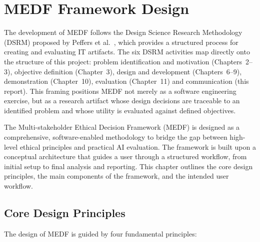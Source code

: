 \chapter{MEDF Framework Design}
\label{ch:design}

The development of MEDF follows the Design Science Research Methodology (DSRM) proposed by Peffers et al.\ \cite{peffers2007}, which provides a structured process for creating and evaluating IT artifacts. The six DSRM activities map directly onto the structure of this project: problem identification and motivation (Chapters~2--3), objective definition (Chapter~3), design and development (Chapters~6--9), demonstration (Chapter~10), evaluation (Chapter~11) and communication (this report). This framing positions MEDF not merely as a software engineering exercise, but as a research artifact whose design decisions are traceable to an identified problem and whose utility is evaluated against defined objectives.

The Multi-stakeholder Ethical Decision Framework (MEDF) is designed as a comprehensive, software-enabled methodology to bridge the gap between high-level ethical principles and practical AI evaluation. The framework is built upon a conceptual architecture that guides a user through a structured workflow, from initial setup to final analysis and reporting. This chapter outlines the core design principles, the main components of the framework, and the intended user workflow.

\section{Core Design Principles}
\label{sec:design_principles}

The design of MEDF is guided by four fundamental principles:

